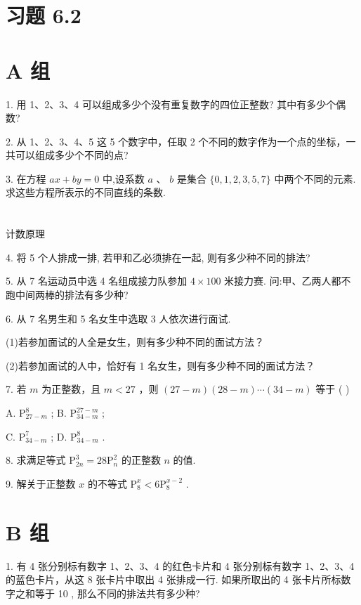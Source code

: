 \documentclass[10pt]{article}
\begin{document}
\section*{习题 6.2}

\section*{A 组}

1. 用 1、2、3、4 可以组成多少个没有重复数字的四位正整数? 其中有多少个偶数?

2. 从 1、2、3、4、5 这 5 个数字中，任取 2 个不同的数字作为一个点的坐标，一共可以组成多少个不同的点?

3. 在方程 \({ax} + {by} = 0\) 中,设系数 \(a\text{ 、 }b\) 是集合 \(\{ 0,1,2,3,5,7\}\) 中两个不同的元素. 求这些方程所表示的不同直线的条数.

\section*{}

计数原理

4. 将 5 个人排成一排, 若甲和乙必须排在一起, 则有多少种不同的排法?

5. 从 7 名运动员中选 4 名组成接力队参加 \(4 \times  {100}\) 米接力赛. 问:甲、乙两人都不跑中间两棒的排法有多少种?

6. 从 7 名男生和 5 名女生中选取 3 人依次进行面试.

(1)若参加面试的人全是女生，则有多少种不同的面试方法？

(2)若参加面试的人中，恰好有 1 名女生，则有多少种不同的面试方法？

7. 若 \(m\) 为正整数，且 \(m < {27}\) ，则 \(\left( {{27} - m}\right) \left( {{28} - m}\right) \cdots \left( {{34} - m}\right)\) 等于 ( )

A. \({\mathrm{P}}_{{27} - m}^{8}\) ; B. \({\mathrm{P}}_{{34} - m}^{{27} - m}\) ;

C. \({\mathrm{P}}_{{34} - m}^{7}\) ; D. \({\mathrm{P}}_{{34} - m}^{8}\) .

8. 求满足等式 \({\mathrm{P}}_{2n}^{3} = {28}{\mathrm{P}}_{n}^{2}\) 的正整数 \(n\) 的值.

9. 解关于正整数 \(x\) 的不等式 \({\mathrm{P}}_{8}^{x} < 6{\mathrm{P}}_{8}^{x - 2}\) .

\section*{B 组}

1. 有 4 张分别标有数字 1、2、3、4 的红色卡片和 4 张分别标有数字 1、2、3、4 的蓝色卡片，从这 8 张卡片中取出 4 张排成一行. 如果所取出的 4 张卡片所标数字之和等于 10 , 那么不同的排法共有多少种?
\end{document}
